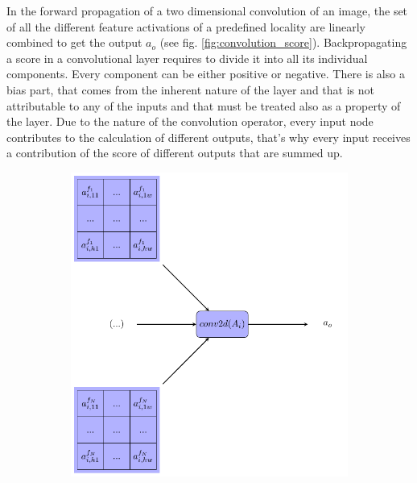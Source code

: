 \documentclass[review]{elsarticle}
\theoremstyle{definition} %
\theoremstyle{remark}
\begin{document}
In the forward propagation of a two dimensional convolution of an image, the set of all the different feature activations of a predefined locality are linearly combined to get the output $a_o$ (see fig. \ref{fig:convolution_score}). Backpropagating a score in a convolutional layer requires to divide it into all its individual components. Every component can be either positive or negative. There is also a bias part, that comes from the inherent nature of the layer and that is not attributable to any of the inputs and that must be treated also as a property of the layer. Due to the nature of the convolution operator, every input node contributes to the calculation of different outputs, that's why every input receives a contribution of the score of different outputs that are summed up.

\begin{figure}[!ht]
	\centering
	\begin{subfigure}{0.4\textwidth}
		\includegraphics[scale=0.4]{./figures/score_conv2d.pdf}
	\end{subfigure}
	~ %
	\begin{subfigure}{0.4\textwidth}

\end{subfigure}
\end{figure}
\end{document}
